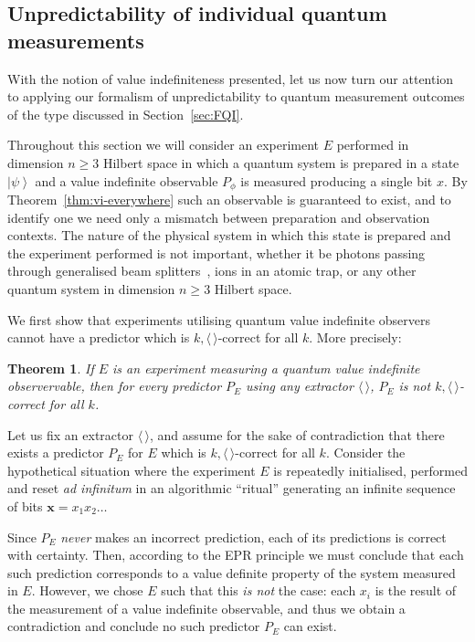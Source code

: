 \documentclass[%
 superscriptaddress,
 preprint,
 showpacs,
 showkeys,
 preprintnumbers,
  amsmath,amssymb,
  aps,
 pra,
  longbibliography,
  floatfix,
 ]{revtex4-1}
\newtheorem{theorem}{Theorem}
\theoremstyle{definition}
\newcommand{\x}{\mathbf{x}}
\newcommand{\ket}[1]{\left| #1 \right>}
\begin{document}
\subsection{Unpredictability of  individual quantum measurements}
\label{sec:physUnpred}

With the notion of value indefiniteness presented, let us now turn our attention to applying our formalism of unpredictability to quantum measurement outcomes of the type discussed in  Section~\ref{sec:FQI}.

Throughout this section we will consider an experiment $E$ performed in dimension $n\ge 3$ Hilbert space in which a quantum system is prepared in a state $\ket{\psi}$ and a value indefinite observable $P_\phi$ is measured producing a single bit $x$.
By Theorem~\ref{thm:vi-everywhere} such an observable is guaranteed to exist, and to identify one we need only a mismatch between preparation and observation contexts.
The nature of the physical system in which this state is prepared and the experiment performed is not important, whether it be photons passing through generalised beam splitters~\cite{rzbb}, ions in an atomic trap, or any other quantum system in dimension $n\ge 3$ Hilbert space.

We first show that experiments utilising quantum value indefinite observers cannot have a predictor which is $k,\langle \, \rangle$-correct for all $k$.
More precisely: 
\begin{theorem} \label{unpredict}If $E$ is an experiment measuring  a quantum value indefinite observervable, then for every predictor $P_E$ using any extractor $\langle\, \rangle$, $P_E$ is not $k,\langle \, \rangle$-correct for all $k$.
\end{theorem}

Let us fix an extractor $\langle\,  \rangle$, and assume for the sake of contradiction that there exists a predictor $P_E$ for $E$ which is $k,\langle \, \rangle$-correct for all $k$.
Consider the hypothetical situation where the experiment $E$ is repeatedly initialised, performed and reset \emph{ad infinitum} in an algorithmic ``ritual'' generating an infinite sequence of bits $\x=x_1x_2\dots$

Since $P_E$ \emph{never} makes an incorrect prediction, each of its predictions is correct with certainty.
Then, according to the EPR principle we must conclude that each such prediction corresponds to a value definite property of the system measured in $E$.
However, we chose $E$ such that this {\it  is not}  the case: each $x_i$ is the result of the measurement of a value indefinite observable, and thus we obtain a contradiction and conclude no such predictor $P_E$ can exist.
\end{document}
